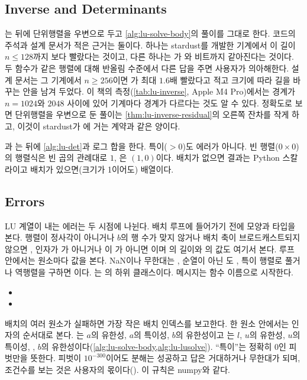 \subsection{Inverse and Determinants}

는  뒤에 단위행렬을 우변으로 두고 \cref{alg:lu-solve-body}의 풀이를 그대로 한다. 코드의 주석과 설계 문서가 적은 근거는 둘이다. 하나는 stardust를 개발한 기계에서 이 길이 $n\le128$까지 보다 빨랐다는 것이고, 다른 하나는 가 와 비트까지 같아진다는 것이다. 두 함수가 같은 행렬에 대해 반올림 수준에서 다른 답을 주면 사용자가 의아해한다. 설계 문서는 그 기계에서 $n\ge256$이면 가 최대 $1.6$배 빨랐다고 적고 크기에 따라 길을 바꾸는 안을 남겨 두었다. 이 책의 측정(\cref{tab:lu-inverse}, Apple M4 Pro)에서는 경계가 $n=1024$와 $2048$ 사이에 있어 기계마다 경계가 다르다는 것도 알 수 있다. 정확도로 보면 단위행렬을 우변으로 둔 풀이는 \cref{thm:lu-inverse-residual}의 오른쪽 잔차를 작게 하고, 이것이 stardust가 에 거는 계약과 같은 양이다.

과 는  뒤에 \cref{alg:lu-det}과 로그 합을 한다. 특이($>0$)도 에러가 아니다. 빈 행렬($0\times0$)의 행렬식은 빈 곱의 관례대로 $1$, 은 $(1,0)$이다. 배치가 없으면 결과는 Python 스칼라이고 배치가 있으면(크기가 1이어도) 배열이다.

\subsection{Errors}

LU 계열이 내는 에러는 두 시점에 나뉜다. 배치 루프에 들어가기 전에 모양과 타입을 본다. 행렬이 정사각이 아니거나 $b$의 행 수가 맞지 않거나 배치 축이 브로드캐스트되지 않으면 , 인자가 가 아니거나 이 가 아니면 이며 의 길이와 의 값도 여기서 본다. 루프 안에서는 원소마다 값을 본다. NaN이나 무한대는 , 순열이 아닌 도 , 특이 행렬로 풀거나 역행렬을 구하면 이다. 는 의 하위 클래스이다. 메시지는 함수 이름으로 시작한다.
\begin{itemize}
\item {}
\item {}
\end{itemize}
배치의 여러 원소가 실패하면 가장 작은 배치 인덱스를 보고한다. 한 원소 안에서는 인자의 순서대로 본다. 는 $a$의 유한성, $a$의 특이성, $b$의 유한성이고 는 $l$, $u$의 유한성, $u$의 특이성, , $b$의 유한성이다(\cref{alg:lu-solve-body,alg:lu-lusolve}). ``특이''는 정확히 $0$인 피벗만을 뜻한다. 피벗이 $10^{-300}$이어도 분해는 성공하고 답은 거대하거나 무한대가 되며, 조건수를 보는 것은 사용자의 몫이다(). 이 규칙은 numpy와 같다.


